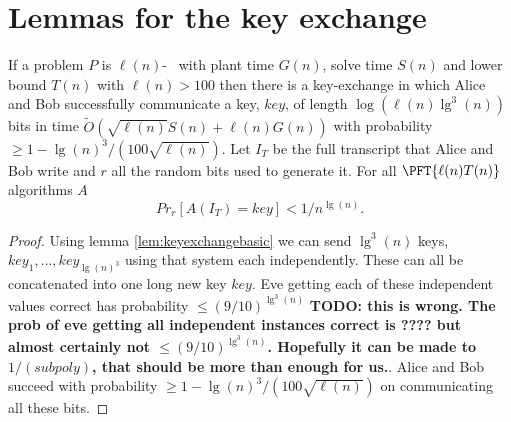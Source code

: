 \section{Lemmas for the key exchange}


\begin{lemma}
		If a problem $P$ is $\ell(n)$-\keyER~ with plant time $G(n)$, solve time $S(n)$ and lower bound $T(n)$ with $\ell(n)>100$ 	
	then there is a key-exchange in which Alice and Bob successfully communicate a key, $key$, of length $\log(\ell(n)\lg^3(n))$ bits in time $\tilde{O}(\sqrt{\ell(n)}S(n) + \ell(n)G(n))$ with probability $\geq 1-\lg(n)^3/(100 \sqrt{\ell(n)})$. Let $I_T$ be the full transcript that Alice and Bob write and $r$ all the random bits used to generate it. For all $\PFT{\ell(n) T(n)}$ algorithms $A$ 
	$$Pr_{r}[A(I_T)=key]<1/n^{\lg(n)}.$$
	\label{lem:keyExchangeEveGuess}
\end{lemma}
\begin{proof}
	
	
Using lemma \ref{lem:keyexchangebasic} we can send $\lg^3(n)$ keys, $key_1,\ldots, key_{\lg(n)^3}$ using that system each independently. These can all be concatenated into one long new key $key$. Eve getting each of these independent values correct has probability $\leq (9/10)^{\lg^3(n)}$ \textbf{TODO: this is wrong. The prob of eve getting all independent instances correct is ???? but almost certainly not  $\leq (9/10)^{\lg^3(n)}$. Hopefully it can be made to $1/(subpoly)$, that should be more than enough for us.}. Alice and Bob succeed with probability $\geq 1-\lg(n)^3/(100 \sqrt{\ell(n)})$ on communicating all these bits. 
\end{proof}



